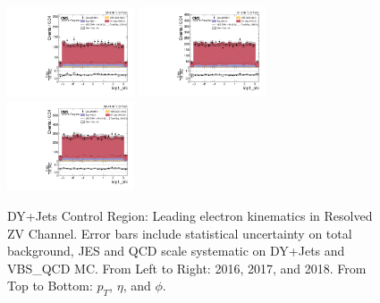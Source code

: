 \begin{figure}[!ht]
  \includegraphics[width=0.335\textwidth]{analysis_plots/2016_zjj/cr_vjets_e/lep1_phi.pdf} \hspace{-10pt}
  \includegraphics[width=0.335\textwidth]{analysis_plots/2017_zjj/cr_vjets_e/lep1_phi.pdf} \hspace{-10pt}
  \includegraphics[width=0.335\textwidth]{analysis_plots/2018_zjj/cr_vjets_e/lep1_phi.pdf} \hspace{-10pt} \\
  \caption[DY+Jets Control Region: Leading electron kinematics in Resolved ZV Channel]%
  {DY+Jets Control Region: Leading electron kinematics in Resolved ZV Channel.
    Error bars include statistical uncertainty on total background,
    JES and QCD scale systematic on DY+Jets and VBS\_QCD MC\@. From Left to Right: 2016,
    2017, and 2018. From Top to Bottom: \( p_T \), \( \eta \), and \( \phi \).}%
  \label{fig:zjj-cr-vjets-e-lep1-pt-eta-phi}
\end{figure}

